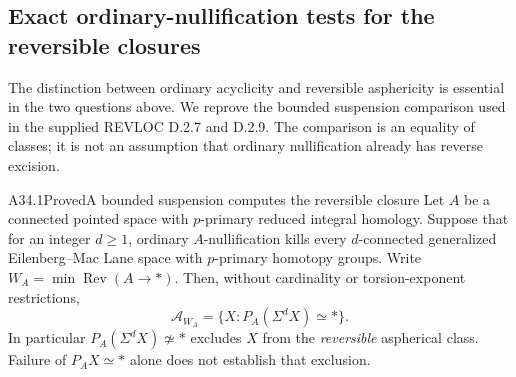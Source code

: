 \subsection{Exact ordinary-nullification tests for the reversible closures}
\label{sec:A34-reduction}

The distinction between ordinary acyclicity and reversible asphericity
is essential in the two questions above.  We reprove the bounded
suspension comparison used in the supplied REVLOC D.2.7 and D.2.9.
The comparison is an equality of classes; it is not an assumption that
ordinary nullification already has reverse excision.

\begin{claim}{A34.1}{Proved}{A bounded suspension computes the reversible closure}\label{A341}
Let $A$ be a connected pointed space with $p$-primary reduced integral
homology.  Suppose that for an integer $d\geq1$, ordinary $A$-nullification
kills every $d$-connected generalized Eilenberg--Mac Lane space with
$p$-primary homotopy groups.  Write $W_A=\min\operatorname{Rev}(A\to *)$.
Then, without cardinality or torsion-exponent restrictions,
\[
 \mathcal A_{W_A}
   =\{X:P_A(\Sigma^dX)\simeq *\}.
 \tag{A34.1.1}
\]
In particular $P_A(\Sigma^dX)\not\simeq *$ excludes $X$ from the
\emph{reversible} aspherical class.  Failure of $P_AX\simeq *$ alone
does not establish that exclusion.
\end{claim}
